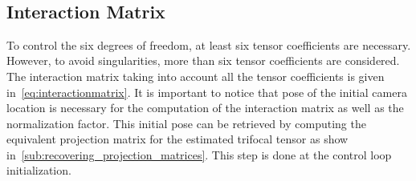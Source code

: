 \begin{equation}
\begin{gathered}
\end{gathered}\label{eq:tensorderivativesgeneral}
\end{equation}

\subsection{Interaction Matrix}
\label{sub:interaction_matrix}
To control the six degrees of freedom, at least six tensor coefficients are necessary. However, to avoid singularities, more than six tensor coefficients are considered. The interaction matrix taking into account all the tensor coefficients is given in~\eqref{eq:interactionmatrix}. It is important to notice that pose of the initial camera location is necessary for the computation of the interaction matrix as well as the normalization factor. This initial pose can be retrieved by computing the equivalent projection matrix for the estimated trifocal tensor as show in~\ref{sub:recovering_projection_matrices}. This step is done at the control loop initialization.

